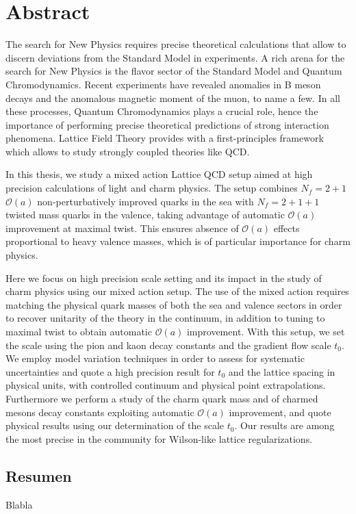 \begingroup
\let\clearpage\relax
\let\cleardoublepage\relax
\let\cleardoublepage\relax

\chapter*{Abstract}
The search for New Physics requires precise theoretical calculations that allow to discern deviations from the Standard Model in experiments. A rich arena for the search for New Physics is the flavor sector of the Standard Model and Quantum Chromodynamics. Recent experiments have revealed anomalies in B meson decays and the anomalous magnetic moment of the muon, to name a few. In all these processes, Quantum Chromodynamics plays a crucial role, hence the importance of performing precise theoretical predictions of strong interaction phenomena. Lattice Field Theory provides with a first-principles framework which allows to study strongly coupled theories like QCD.

In this thesis, we study a mixed action Lattice QCD setup aimed at high precision calculations of light and charm physics. The setup combines $N_f=2+1$ $\mathcal{O}(a)$ non-perturbatively improved quarks in the sea with $N_f=2+1+1$ twisted mass quarks in the valence, taking advantage of automatic $\mathcal{O}(a)$ improvement at maximal twist. This ensures absence of $\mathcal{O}(a)$ effects proportional to heavy valence masses, which is of particular importance for charm physics. 

Here we focus on high precision scale setting and its impact in the study of charm physics using our mixed action setup. The use of the mixed action requires matching the physical quark masses of both the sea and valence sectors in order to recover unitarity of the theory in the continuum, in addition to tuning to maximal twist to obtain automatic $\mathcal{O}(a)$ improvement. With this setup, we set the scale using the pion and kaon decay constants and the gradient flow scale $t_0$. We employ model variation techniques in order to assess for systematic uncertainties and quote a high precision result for $t_0$ and the lattice spacing in physical units, with controlled continuum and physical point extrapolations. Furthermore we perform a study of the charm quark mass and of charmed mesons decay constants exploiting automatic $\mathcal{O}(a)$ improvement, and quote physical results using our determination of the scale $t_0$. Our results are among the most precise in the community for Wilson-like lattice regularizations.

\vfill

\begin{otherlanguage}{spanish}
\chapter*{Resumen}
Blabla
\end{otherlanguage}

\endgroup

\vfill
